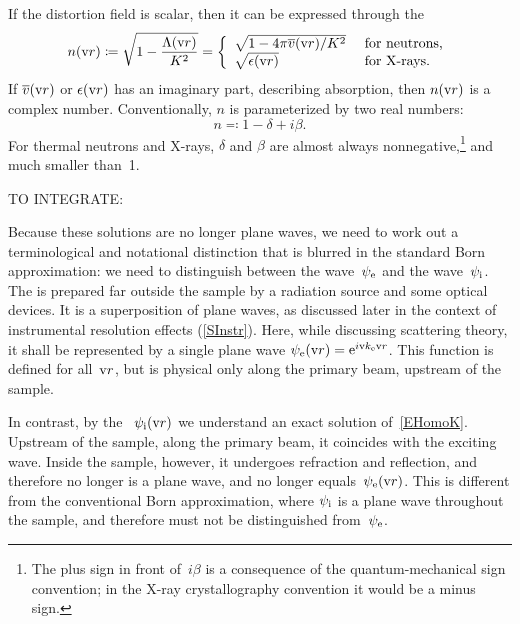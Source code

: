 If the distortion field is scalar,
then it can be expressed through the 
%
%
%
\begin{equation}\label{EnkK}
  n(\text{v}{r})
  \coloneqq\sqrt{1-\frac{\Lambda(\text{v}{r})}{K^2}}
  = \left\{\begin{array}{ll}
       \sqrt{1-4\pi\overline{v}(\text{v}{r})/K^2} &\text{ for neutrons,}\\
       \sqrt{\epsilon(\text{v}{r})} &\text{ for X-rays.}
    \end{array}\right.
\end{equation}
If $\overline{v}(\text{v}{r})$ or $\epsilon(\text{v}{r})$ has an imaginary part, describing absorption,
%
then $n(\text{v}{r})$ is a complex number.
Conventionally, $n$ is parameterized by two real numbers:
\begin{equation}\label{Endb1}
  n \eqqcolon  1-\delta +i\beta.
\end{equation}
%
%
For thermal neutrons and X-rays,
$\delta$ and $\beta$ are almost always nonnegative,\footnote
{The plus sign in front of~$i\beta$ is a consequence of
the quantum-mechanical sign convention;
in the X-ray crystallography convention it would be a minus sign.
%
}
and much smaller than~1.

TO INTEGRATE:

Because these solutions are no longer plane waves,
we need to work out a terminological and notational distinction
that is blurred in the standard Born approximation:
we need to distinguish
 between the  wave~$\psi_{\text{e}}$
%
and the  wave~$\psi_{\text{i}}$.
The 
%
%
is prepared far
outside the sample by a radiation source and some optical devices.
%
It is a superposition of plane waves,
as discussed later in the context of instrumental resolution effects
(\cref{SInstr}).
Here, while discussing scattering theory,
it shall be represented by a single plane wave
$\psi_{\text{e}}(\text{v}{r})=\mathrm e^{i\text{v}{k}_{\text{e}}\text{v}{r}}$.
This function is defined for all~$\text{v}{r}$,
but is physical only along the primary beam, upstream of the sample.

In contrast, by the ~$\psi_{\text{i}}(\text{v}{r})$
%
%
%
we understand an exact solution of~\cref{EHomoK}.
Upstream of the sample, along the primary beam, it coincides with the exciting wave.
Inside the sample, however, it undergoes refraction and reflection,
and therefore no longer is a plane wave, and no longer equals~$\psi_{\text{e}}(\text{v}{r})$.
This is different from the conventional Born approximation,
where $\psi_{\text{i}}$ is a plane wave throughout the sample,
and therefore must not be distinguished from~$\psi_{\text{e}}$.

